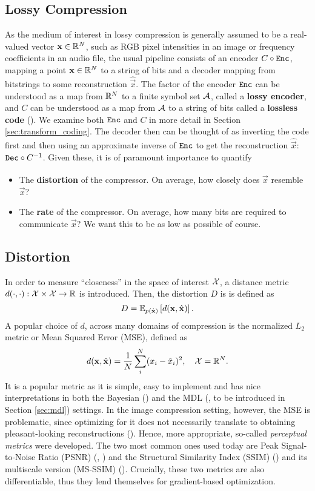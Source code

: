 \subsection{Lossy Compression}
As the medium of interest in lossy compression is generally assumed to be a
real-valued vector $\vec{x} \in \Reals^N$, such as RGB pixel intensities in an
image or frequency coefficients in an audio file, the usual pipeline consists of 
an encoder $C \circ \Enc$, mapping a point $\vec{x} \in \Reals^N$ to a string of bits and a
decoder mapping from bitstrings to some reconstruction $\hat{\vec{x}}$. The
factor of the encoder $\Enc$  can be understood as a map from $\Reals^N$ to a
finite symbol set $\A$, called a \textbf{lossy encoder}, and $C$ can be
understood as a map from $\A$ to a
string of bits called a \textbf{lossless code} (\cite{goyal2001theoretical}).
We examine both $\Enc$ and $C$ in more detail in Section
\ref{sec:transform_coding}.
The decoder then can be thought of as inverting the code first and then using an
approximate inverse of
$\Enc$ to get the reconstruction $\hat{\vec{x}}$: $\Dec \circ C^{-1}$.
Given these, it is of paramount importance to quantify
\begin{itemize}
\item The \textbf{distortion} of the compressor. On average, how closely does
  $\hat{\vec{x}}$ resemble $\vec{x}$?
\item The \textbf{rate} of the compressor. On average, how many bits are
  required to communicate $\vec{x}$? We want this to be as low as possible of course.
\end{itemize}

\subsection{Distortion}
\label{sec:intro_distrotion}
In order to measure ``closeness'' in the space of interest $\ImSpace$,
a distance metric $d(\cdot, \cdot): \ImSpace
\times \ImSpace \rightarrow \Reals$ is introduced. Then, the distortion $D$ is 
is defined as
\[
  D = \Exp{d(\vec{x}, \hat{\vec{x}})}{p(\hat{\vec{x}})}.
\]
A popular choice of $d$, across many domains of compression is the normalized $L_2$ metric
or Mean Squared Error (MSE), defined as
\[
  d(\vec{x}, \hat{\vec{x}}) = \frac{1}{N} \sum_{i}^N (x_i - \hat{x}_i)^2, \quad
  \ImSpace = \Reals^N.
\]
It is a popular metric as it is simple, easy to implement and has nice
interpretations in both the Bayesian (\cite{bishop2013pattern}) and the MDL
(\cite{hinton1993keeping}, to be introduced in Section \ref{sec:mdl}) settings.
In the image compression setting, however, the MSE is problematic, since 
optimizing for it does not necessarily translate to obtaining pleasant-looking
reconstructions (\cite{zhao2015loss}). Hence, more appropriate, so-called
\textit{perceptual metrics} were developed. The two most common ones used today
are Peak Signal-to-Noise Ratio (PSNR) (\cite{psnr}, \cite{gupta2011modified}) and the
Structural Similarity Index (SSIM) (\cite{wang2004image}) and its multiscale
version (MS-SSIM) (\cite{msssim}). Crucially, these two metrics are also
differentiable, thus they lend themselves for gradient-based optimization.

